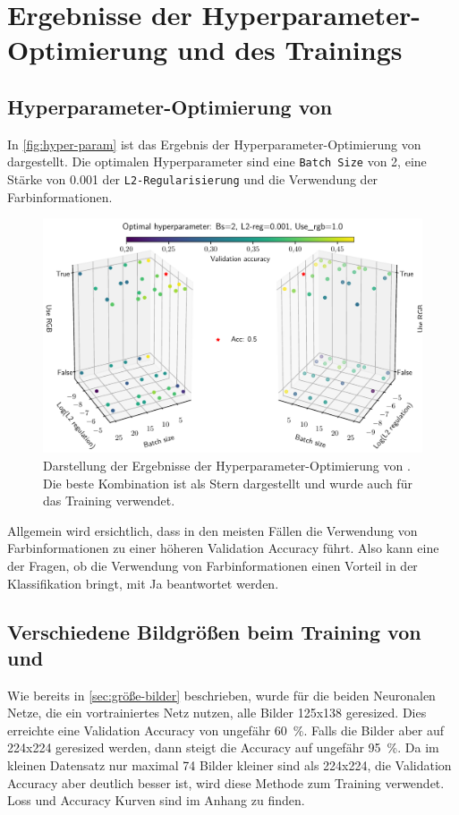 \chapter{Ergebnisse der Hyperparameter-Optimierung und des Trainings}
\section{Hyperparameter-Optimierung von \MiniDog}

In \autoref{fig:hyper-param} ist das Ergebnis der Hyperparameter-Optimierung von \MiniDog
dargestellt. Die optimalen Hyperparameter sind eine \texttt{Batch Size} von 2,
eine Stärke von 0.001 der \texttt{L2-Regularisierung} und die Verwendung
der Farbinformationen.

\begin{figure}
  \centering
  \includegraphics[width=\textwidth]{pics/ergebnisse/hyper_raum.pdf}
  \caption{Darstellung der Ergebnisse der Hyperparameter-Optimierung
  von \MiniDog. Die beste Kombination ist als Stern dargestellt und wurde auch
  für das Training verwendet.}
  \label{fig:hyper-param}
\end{figure}

Allgemein wird ersichtlich, dass in den meisten Fällen die Verwendung von Farbinformationen
zu einer höheren Validation Accuracy führt. Also kann eine der Fragen, ob die Verwendung
von Farbinformationen einen Vorteil in der Klassifikation bringt, mit Ja beantwortet werden.

\section{Verschiedene Bildgrößen beim  Training von \PreDog und \PreBig}

Wie bereits in \autoref{sec:größe-bilder} beschrieben, wurde für die beiden
Neuronalen Netze, die ein vortrainiertes Netz nutzen, alle Bilder 125x138
geresized. Dies erreichte eine Validation Accuracy von ungefähr \SI{60}{\percent}.
Falls die Bilder aber auf 224x224 geresized werden, dann steigt die Accuracy
auf ungefähr \SI{95}{\percent}. Da im kleinen Datensatz nur maximal 74 Bilder
kleiner sind als 224x224, die Validation Accuracy aber deutlich besser ist, wird diese Methode zum Training verwendet.
Loss und Accuracy Kurven sind im Anhang zu finden.

